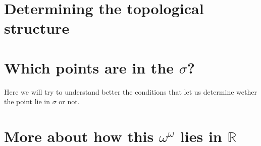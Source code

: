 \section{Determining the topological structure}


\section{Which points are in the $\sigma$?}
Here we will try to understand better the conditions that let us determine wether the point 
lie in $\sigma$ or not.



\section{More about how this $\omega^\omega$ lies in $\mathbb{R}$}


